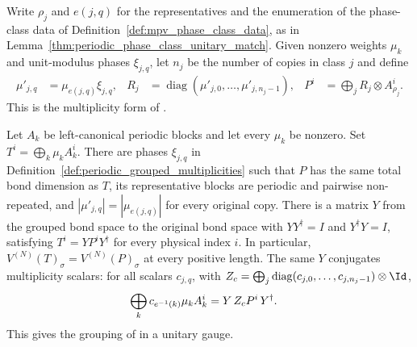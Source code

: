 \begin{definition}
    \label{def:periodic_grouped_multiplicities}
    \leanok
    Write $\rho_j$ and $e(j,q)$ for the representatives and the enumeration of
    the phase-class data of Definition~\ref{def:mpv_phase_class_data}, as in
    Lemma~\ref{thm:periodic_phase_class_unitary_match}. Given nonzero
    weights $\mu_k$ and unit-modulus phases $\xi_{j,q}$, let $n_j$ be
    the number of copies in class $j$ and define
    \begin{align}
        \label{eq:periodic_grouped_multiplicities}
        \mu'_{j,q} & =\mu_{e(j,q)}\xi_{j,q},                                 &
        R_j        & =\operatorname{diag}(\mu'_{j,0},\ldots,\mu'_{j,n_j-1}), &
        P^i        & =\bigoplus_j R_j\otimes A_{\rho_j}^i.
    \end{align}
    This is the multiplicity form of \cite[Section~2.1]{DeLasCuevas2017Irreducible}.
\end{definition}

\begin{lemma}
    \label{thm:periodic_grouped_unitary}
    \leanok
    Let $A_k$ be left-canonical periodic blocks and let every $\mu_k$ be
    nonzero. Set $T^i=\bigoplus_k\mu_k A_k^i$.
    There are phases $\xi_{j,q}$ in
    Definition~\ref{def:periodic_grouped_multiplicities} such that $P$
    has the same total bond dimension as $T$, its representative blocks
    are periodic and pairwise non-repeated, and
    $|\mu'_{j,q}|=|\mu_{e(j,q)}|$ for every original copy.
    There is a matrix $Y$ from the grouped bond space to the original bond
    space with $YY^\dagger=I$ and $Y^\dagger Y=I$, satisfying
    $T^i=YP^iY^\dagger$ for every physical index $i$.
    In particular, $V^{(N)}(T)_\sigma=V^{(N)}(P)_\sigma$ at every positive length.
    The same $Y$ conjugates multiplicity scalars: for all scalars $c_{j,q}$,
    with $Z_c=\bigoplus_j\operatorname{diag}(c_{j,0},\ldots,c_{j,n_j-1})\otimes\Id$,
    \begin{align}
        \bigoplus_kc_{e^{-1}(k)}\mu_kA_k^i & =Y\,Z_cP^i\,Y^\dagger. \notag
    \end{align}
    This gives the grouping of \cite[Section~2.1 and the paragraph after
        Theorem~3.4]{DeLasCuevas2017Irreducible} in a unitary gauge.
\end{lemma}

